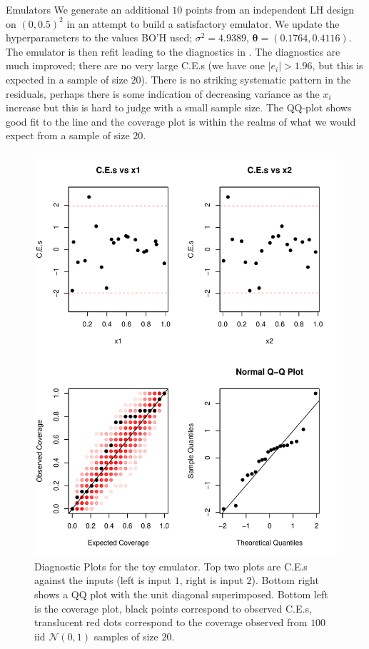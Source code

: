 \begin{chapter}{Emulators \label{Ch:Emulators}}
We generate an additional $10$ points from an independent LH design on $(0, 0.5)^2$ in an attempt to build a satisfactory emulator. We update the hyperparameters to the values BO'H used; $\sigma^2 = 4.9389$, $\bm{\theta} =  (0.1764, 0.4116)$. The emulator is then refit leading to the diagnostics in . The diagnostics are much improved; there are no very large C.E.s (we have one $|e_i|>1.96$, but this is expected in a sample of size $20$). There is no striking systematic pattern in the residuals, perhaps there is some indication of decreasing variance as the $x_i$ increase but this is hard to judge with a small sample size. The QQ-plot shows good fit to the line and the coverage plot is within the realms of what we would expect from a sample of size $20$.
\begin{figure}[h]
  \centering
  \includegraphics{fig-emulators/diag2.pdf}
  \caption{Diagnostic Plots for the toy emulator. Top two plots are C.E.s against the inputs (left is input $1$, right is input $2$). Bottom right shows a QQ plot with the unit diagonal superimposed. Bottom left is the coverage plot, black points correspond to observed C.E.s, translucent red dots correspond to the coverage observed from $100$ iid $\mathcal{N}(0,1)$ samples of size $20$.}
  \label{Fig:diag2}
\end{figure}

\end{chapter}
